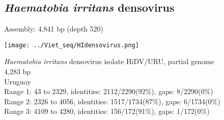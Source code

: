 \subsection{\textit{Haematobia irritans} densovirus}
\begin{frame}
Assembly: 4,841 bp (depth 520)\\

\begin{center}
\texttt{[image: ../Viet\_seq/HIdensovirus.png]}
\end{center}

\textit{Haematobia irritans} densovirus isolate HiDV/URU, partial genome\\
4,283 bp\\
Uruguay\\
Range 1: 43 to 2329, identities: 2112/2290(92\%), gaps: 8/2290(0\%)\\
Range 2: 2326 to 4056, identities: 1517/1734(87\%), gaps: 6/1734(0\%)\\
Range 3: 4109 to 4280, identities: 156/172(91\%), gaps: 1/172(0\%)\\
\end{frame}

